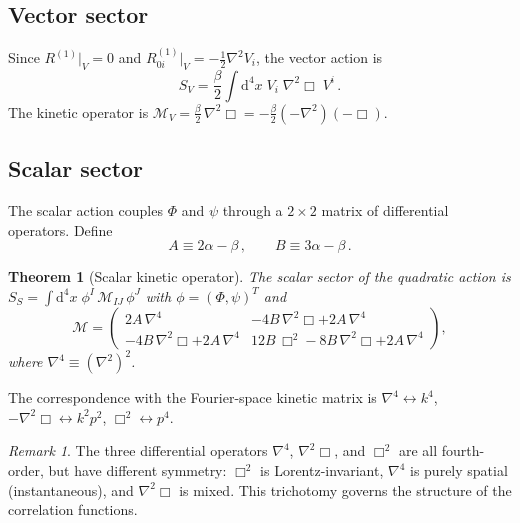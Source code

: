 \documentclass[11pt,a4paper]{article}
\newcommand{\dd}{\mathrm{d}}
\newtheorem{theorem}{Theorem}
\theoremstyle{definition}
\theoremstyle{remark}
\newtheorem{remark}{Remark}
\begin{document}
\subsection{Vector sector}

Since $R^{(1)}|_V = 0$ and
$R^{(1)}_{0i}|_V = -\frac{1}{2}\nabla^2 V_i$, the vector action is
\begin{equation}\label{eq:S-V}
  \boxed{
  S_V = \frac{\beta}{2}\int\dd^4x\;
    V_i\;\nabla^2\Box\; V^i\,.}
\end{equation}
The kinetic operator is
$\mathcal{M}_V = \frac{\beta}{2}\,\nabla^2\Box = -\frac{\beta}{2}(-\nabla^2)(-\Box)$.

\subsection{Scalar sector}

The scalar action couples $\Phi$ and $\psi$ through a $2\times 2$
matrix of differential operators.  Define
\begin{equation}\label{eq:AB}
  A \equiv 2\alpha - \beta\,,\qquad
  B \equiv 3\alpha - \beta\,.
\end{equation}

\begin{theorem}[Scalar kinetic operator]\label{thm:scalar-M}
The scalar sector of the quadratic action is
$S_S = \int\dd^4x\;\phi^I\,\mathcal{M}_{IJ}\,\phi^J$
with $\phi = (\Phi,\psi)^T$ and
\begin{equation}\label{eq:scalar-M}
  \mathcal{M} = \begin{pmatrix}
    2A\,\nabla^4
    & -4B\,\nabla^2\Box + 2A\,\nabla^4 \\[6pt]
    -4B\,\nabla^2\Box + 2A\,\nabla^4
    & 12B\,\Box^2 - 8B\,\nabla^2\Box + 2A\,\nabla^4
  \end{pmatrix},
\end{equation}
where $\nabla^4 \equiv (\nabla^2)^2$.
\end{theorem}

The correspondence with the Fourier-space kinetic matrix is
$\nabla^4 \leftrightarrow k^4$,
$-\nabla^2\Box \leftrightarrow k^2 p^2$,
$\Box^2 \leftrightarrow p^4$.

\begin{remark}
The three differential operators $\nabla^4$, $\nabla^2\Box$, and
$\Box^2$ are all fourth-order, but have different symmetry:
$\Box^2$ is Lorentz-invariant,
$\nabla^4$ is purely spatial (instantaneous), and
$\nabla^2\Box$ is mixed.
This trichotomy governs the structure of the correlation functions.
\end{remark}
\end{document}
